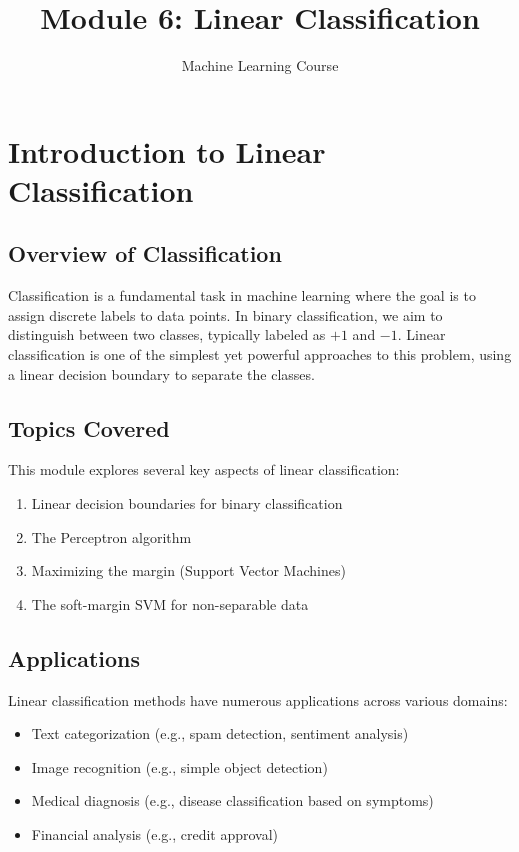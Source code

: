 \documentclass{article}
\title{Module 6: Linear Classification}
\author{Machine Learning Course}
\date{}
\begin{document}
\maketitle
\tableofcontents
\newpage

\section{Introduction to Linear Classification}

\subsection{Overview of Classification}
Classification is a fundamental task in machine learning where the goal is to assign discrete labels to data points. In binary classification, we aim to distinguish between two classes, typically labeled as $+1$ and $-1$. Linear classification is one of the simplest yet powerful approaches to this problem, using a linear decision boundary to separate the classes.

\subsection{Topics Covered}
This module explores several key aspects of linear classification:
\begin{enumerate}
    \item Linear decision boundaries for binary classification
    \item The Perceptron algorithm
    \item Maximizing the margin (Support Vector Machines)
    \item The soft-margin SVM for non-separable data
\end{enumerate}

\subsection{Applications}
Linear classification methods have numerous applications across various domains:
\begin{itemize}
    \item Text categorization (e.g., spam detection, sentiment analysis)
    \item Image recognition (e.g., simple object detection)
    \item Medical diagnosis (e.g., disease classification based on symptoms)
    \item Financial analysis (e.g., credit approval)
\end{itemize}
\end{document}
